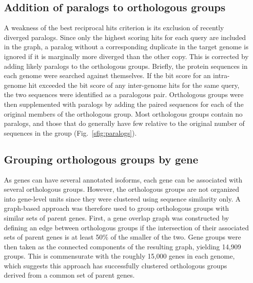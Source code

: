 \subsection*{Addition of paralogs to orthologous groups}
A weakness of the best reciprocal hits criterion is its exclusion of recently diverged paralogs. Since only the highest scoring hits for each query are included in the graph, a paralog without a corresponding duplicate in the target genome is ignored if it is marginally more diverged than the other copy. This is corrected by adding likely paralogs to the orthologous groups. Briefly, the protein sequences in each genome were searched against themselves. If the bit score for an intra-genome hit exceeded the bit score of any inter-genome hits for the same query, the two sequences were identified as a paralogous pair. Orthologous groups were then supplemented with paralogs by adding the paired sequences for each of the original members of the orthologous group. Most orthologous groups contain no paralogs, and those that do generally have few relative to the original number of sequences in the group (Fig.~\ref{sfig:paralogs}).

\subsection*{Grouping orthologous groups by gene}
As genes can have several annotated isoforms, each gene can be associated with several orthologous groups. However, the orthologous groups are not organized into gene-level units since they were clustered using sequence similarity only. A graph-based approach was therefore used to group orthologous groups with similar sets of parent genes. First, a gene overlap graph was constructed by defining an edge between orthologous groups if the intersection of their associated sets of parent genes is at least 50\% of the smaller of the two. Gene groups were then taken as the connected components of the resulting graph, yielding 14,909 groups. This is commensurate with the roughly 15,000 genes in each genome, which suggests this approach has successfully clustered orthologous groups derived from a common set of parent genes.

